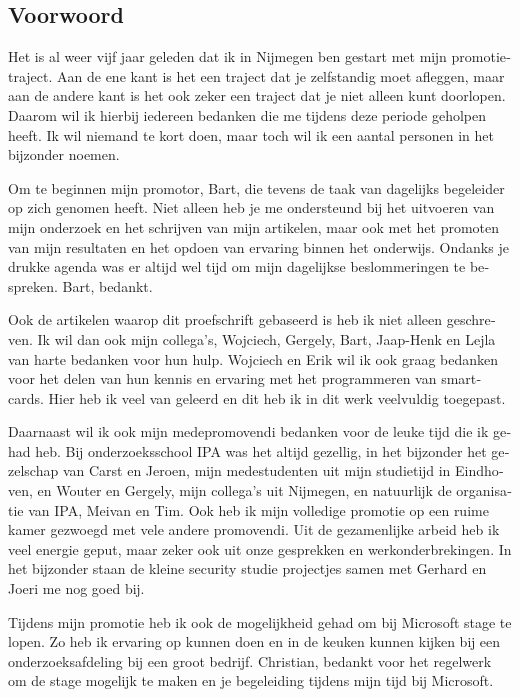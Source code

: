 \begin{otherlanguage}{dutch}

\chapter*{Voorwoord}

Het is al weer vijf jaar geleden dat ik in Nijmegen ben gestart met mijn 
promotietraject. Aan de ene kant is het een traject dat je zelfstandig moet 
afleggen, maar aan de andere kant is het ook zeker een traject dat je niet
alleen kunt doorlopen. Daarom wil ik hierbij iedereen bedanken die me tijdens 
deze periode geholpen heeft. Ik wil niemand te kort doen, maar toch wil ik een
aantal personen in het bijzonder noemen.

Om te beginnen mijn promotor, Bart, die tevens de taak van dagelijks begeleider 
op zich genomen heeft. Niet alleen heb je me ondersteund bij het uitvoeren van 
mijn onderzoek en het schrijven van mijn artikelen, maar ook met het promoten 
van mijn resultaten en het opdoen van ervaring binnen het onderwijs. Ondanks je
drukke agenda was er altijd wel tijd om mijn dagelijkse beslommeringen te 
bespreken. Bart, bedankt.

Ook de artikelen waarop dit proefschrift gebaseerd is heb ik niet alleen 
geschreven. Ik wil dan ook mijn collega's, Wojciech, Gergely, Bart, Jaap-Henk
en Lejla van harte bedanken voor hun hulp. Wojciech en Erik wil ik ook graag 
bedanken voor het delen van hun kennis en ervaring met het programmeren van 
smartcards. Hier heb ik veel van geleerd en dit heb ik in dit werk veelvuldig 
toegepast.

Daarnaast wil ik ook mijn medepromovendi bedanken voor de leuke tijd die ik 
gehad heb. Bij onderzoeksschool IPA was het altijd gezellig, in het bijzonder 
het gezelschap van Carst en Jeroen, mijn medestudenten uit mijn studietijd in 
Eindhoven, en Wouter en Gergely, mijn collega's uit Nijmegen, en natuurlijk de 
organisatie van IPA, Meivan en Tim. Ook heb ik mijn volledige promotie op een 
ruime kamer gezwoegd met vele andere promovendi. Uit de gezamenlijke arbeid heb
ik veel energie geput, maar zeker ook uit onze gesprekken en werkonderbrekingen.
In het bijzonder staan de kleine security studie projectjes samen met Gerhard 
en Joeri me nog goed bij.

Tijdens mijn promotie heb ik ook de mogelijkheid gehad om bij Microsoft stage 
te lopen. Zo heb ik ervaring op kunnen doen en in de keuken kunnen kijken bij 
een onderzoeksafdeling bij een groot bedrijf. Christian, bedankt voor het
regelwerk om de stage mogelijk te maken en je begeleiding tijdens mijn tijd bij
Microsoft.


\end{otherlanguage}

